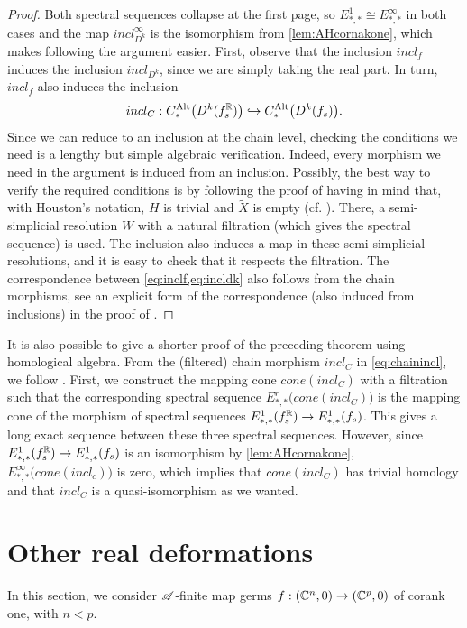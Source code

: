\documentclass[a4paper,12pt]{amsart}
\begin{document}
\begin{proof}
Both spectral sequences collapse at the first page, so $E^1_{*,*}\cong E^\infty_{*,*}$ in both cases and the map $incl_{D^k}^\infty$ is the isomorphism from \cref{lem:AHcornakone}, which makes following the argument easier. First, observe that the inclusion $incl_f$ induces the inclusion $incl_{D^k}$, since we are simply taking the real part. In turn, $incl_f$ also induces the inclusion 
\begin{equation}\label{eq:chainincl}
incl_C:C^{\textnormal{Alt}}_*\big(D^k(f_s^{\mathbb{R}})\big)\hookrightarrow C^{\textnormal{Alt}}_*\big(D^k(f_s)\big).
\end{equation}
Since we can reduce to an inclusion at the chain level, checking the conditions we need is a lengthy but simple algebraic verification. Indeed, every morphism we need in the argument is induced from an inclusion. Possibly, the best way to verify the required conditions is by following the proof of \cite[Theorem 5.4]{Houston2007} having in mind that, with Houston's notation, $H$ is trivial and $\widetilde{X}$ is empty (cf. \cite{Goryunov1995}). There, a semi-simplicial resolution $W$ with a natural filtration (which gives the spectral sequence) is used. The inclusion also induces a map in these semi-simplicial resolutions, and it is easy to check that it respects the filtration. The correspondence between \cref{eq:inclf,eq:incldk} also follows from the chain morphisms, see an explicit form of the correspondence (also induced from inclusions) in the proof of \cite[Theorem 2.6]{McCleary2001}.
\end{proof}

\begin{remark}\label{rem:homologicalalgebra}
It is also possible to give a shorter proof of the preceding theorem using homological algebra. From the (filtered) chain morphism $incl_C$ in \cref{eq:chainincl}, we follow \cite[Exercise 5.4.4]{Weibel1994}. First, we construct the mapping cone $cone(incl_C)$ with a filtration such that the corresponding spectral sequence $E^r_{*,*}\big(cone(incl_C)\big)$ is the mapping cone of the morphism of spectral sequences $E^1_{*,*}(f_s^{\mathbb{R}})\rightarrow E^1_{*,*}(f_s)$. This gives a long exact sequence between these three spectral sequences. However, since $E^1_{*,*}(f_s^{\mathbb{R}})\rightarrow E^1_{*,*}(f_s)$ is an isomorphism by \cref{lem:AHcornakone}, $E^\infty_{*,*}\big(cone(incl_c)\big)$ is zero, which implies that $cone(incl_C)$ has trivial homology and that $incl_C$ is a quasi-isomorphism as we wanted.
\end{remark}


\section{Other real deformations}\label{sec:otherdeformations}
In this section, we consider $\mathscr{A}$-finite map germs $f:(\mathbb{C}^n,0)\to(\mathbb{C}^p,0)$ of corank one, with $n<p$.
\newline
\end{document}
